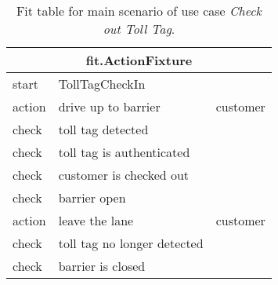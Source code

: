 \begin{table}[H]
\begin{center}
\begin{tabular}{|l|l|l|}
\hline \multicolumn{3}{|c|}{fit.ActionFixture}\tabularnewline
\hline start & \multicolumn{1}{l}{TollTagCheckIn} & \tabularnewline
\hline action & drive up to barrier & customer \tabularnewline
\hline check & \multicolumn{1}{l}{toll tag detected} &\tabularnewline
\hline check & \multicolumn{1}{l}{toll tag is authenticated} & \tabularnewline
\hline check & \multicolumn{1}{l}{customer is checked out} & \tabularnewline
\hline check & \multicolumn{1}{l}{barrier open} & \tabularnewline
\hline action & leave the lane & customer \tabularnewline
\hline check & \multicolumn{1}{l}{toll tag no longer detected} & \tabularnewline
\hline check & \multicolumn{1}{l}{barrier is closed} & \tabularnewline
\hline 
\end{tabular}
\end{center}
\caption{Fit table for main scenario of use case \emph{Check out Toll Tag}.}
\end{table}
